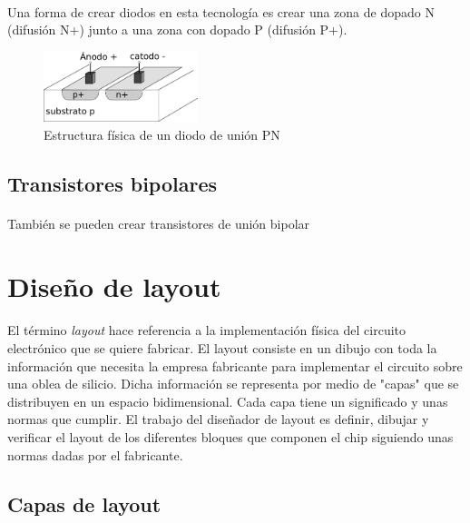 \paragraph{}
Una forma de crear diodos en esta tecnología es crear una zona de dopado N (difusión N+)
junto a una zona con dopado P (difusión P+).

\begin{figure}[h]
	\centering
	\includegraphics[width=0.4\textwidth]{img/diodo.png}
	\caption{Estructura física de un diodo de unión PN}
	\label{fig:diodo}
\end{figure}

\subsection{Transistores bipolares}
\paragraph{}
También se pueden crear transistores de unión bipolar

\section{Diseño de layout}

\paragraph{}
El término \textit{layout} hace referencia a la implementación física del circuito
electrónico que se quiere fabricar. El layout consiste en un dibujo con toda
la información que necesita la empresa fabricante para implementar el circuito
sobre una oblea de silicio. Dicha información se representa por medio de "capas"
que se distribuyen en un espacio bidimensional. Cada capa tiene un significado y
unas normas que cumplir. El trabajo del diseñador de layout es definir, dibujar y
verificar el layout de los diferentes bloques que componen el chip siguiendo
unas normas dadas por el fabricante.

\subsection{Capas de layout}

